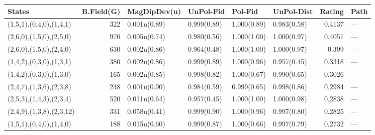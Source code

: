 \begin{tabular}{lrllllrl}
\hline
 States                   &   B.Field(G) & MagDipDev(u)   & UnPol-Fid   & Pol-Fid     & UnPol-Dist   &   Rating & Path   \\
\hline
 (1,5,1),(0,4,0),(1,4,1)  &          322 & 0.001u(0.89)   & 0.999(0.89) & 1.000(0.89) & 0.983(0.58)  &   0.4137 & ---    \\
 (2,6,0),(1,5,0),(2,5,0)  &          970 & 0.005u(0.74)   & 0.980(0.56) & 1.000(1.00) & 1.000(0.97)  &   0.4051 & ---    \\
 (2,6,0),(1,5,0),(2,4,0)  &          630 & 0.002u(0.86)   & 0.964(0.48) & 1.000(1.00) & 1.000(0.97)  &   0.399  & ---    \\
 (1,4,2),(0,3,0),(1,3,1)  &          380 & 0.002u(0.86)   & 0.999(0.89) & 1.000(0.96) & 0.957(0.45)  &   0.3318 & ---    \\
 (1,4,2),(0,3,0),(1,3,0)  &          165 & 0.002u(0.85)   & 0.998(0.82) & 1.000(0.67) & 0.990(0.65)  &   0.3026 & ---    \\
 (2,4,7),(1,3,6),(2,3,8)  &          248 & 0.001u(0.90)   & 0.984(0.59) & 0.999(0.65) & 0.998(0.86)  &   0.2984 & ---    \\
 (2,5,3),(1,4,3),(2,3,4)  &          520 & 0.011u(0.64)   & 0.957(0.45) & 1.000(1.00) & 1.000(0.98)  &   0.2838 & ---    \\
 (2,4,9),(1,3,8),(2,3,12) &          331 & 0.058u(0.41)   & 0.999(0.90) & 1.000(0.96) & 0.997(0.80)  &   0.2825 & ---    \\
 (1,5,1),(0,4,0),(1,4,0)  &          188 & 0.015u(0.60)   & 0.999(0.87) & 1.000(0.66) & 0.997(0.79)  &   0.2732 & ---    \\
\hline
\end{tabular}